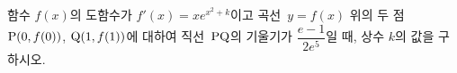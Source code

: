 \hspace*{2mm}\begin{minipage}[t]{\dimexpr\linewidth-2mm\relax}\vspace{0pt}
함수 $f(x)$의 도함수가 $f'(x)=xe^{x^2+k}$이고 곡선~$y=f(x)$ 위의 두 점~$\mathrm{P}(0{,}\mkern3mu\mathopen{}f(0))$, $\mathrm{Q}(1{,}\mkern3mu\mathopen{}f(1))$에 대하여 직선~$\mathrm{PQ}$의 기울기가 $\dfrac{e-1}{2e^5}$일 때, 상수 $k$의 값을 구하시오.\end{minipage}
